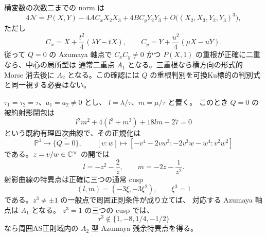 \begin{remark}
\label{ifq:rem:transverse}
横変数の次数二までの norm は
\[
 4\mathcal N
 =P(X,Y)-4A C_xX_2X_3+4B C_yY_2Y_3
     +O\bigl((X_2,X_3,Y_2,Y_3)^3\bigr),
\]
ただし
\[
 C_x=X+\frac{t^2}{4}(\lambda Y-tX),\qquad
 C_y=Y+\frac{u^2}{4}(\mu X-uY).
\]
従って $Q=0$ の Azumaya 軸点で $C_xC_y\ne0$ かつ
$P(X,1)$ の重根が正確に二重なら、中心の局所型は
通常二重点 $A_1$ となる。三重根なら横方向の形式的 Morse
消去後に $A_2$ となる。この確認には
$Q$ の重根判別を可換Ku標的の判別式と同一視する必要はない。
\end{remark}

\begin{theorem}[対称因子での三尖点有理四次曲線]
\label{ifq:thm:tricuspidal}
$\tau_1=\tau_2=\tau$、$a_1=a_2\ne0$ とし、
$l=\lambda/\tau$、$m=\mu/\tau$ と置く。
このとき $Q=0$ の被約射影閉包は
\begin{equation}\label{ifq:eq:deltoid}
       l^2m^2+4(l^3+m^3)+18lm-27=0
\end{equation}
という既約有理四次曲線で、その正規化は
\begin{equation}\label{ifq:eq:param}
 \mathbb P^1\longrightarrow\overline{\{Q=0\}},\qquad
 [v:w]\longmapsto
 [-v^4-2vw^3:-2v^3w-w^4:v^2w^2]
\end{equation}
である。$z=v/w\in\mathbb C^\times$ の開では
\[
          l=-z^2-\frac2z,\qquad
          m=-2z-\frac1{z^2}.
\]
射影曲線の特異点は正確に三つの通常 cusp
\begin{equation}\label{ifq:eq:three-cusps}
           (l,m)=(-3\xi,-3\xi^2),\qquad \xi^3=1
\end{equation}
である。$z^3\ne\pm1$ の一般点で周囲正則条件が成り立てば、
対応する Azumaya 軸点は $A_1$ となる。
$z^3=1$ の三つの cusp では、
\[
            \tau^3\notin\{1,-8,1/4,-1/2\}
\]
なら周囲AS正則域内の $A_2$ 型 Azumaya 残余特異点を得る。
\end{theorem}

